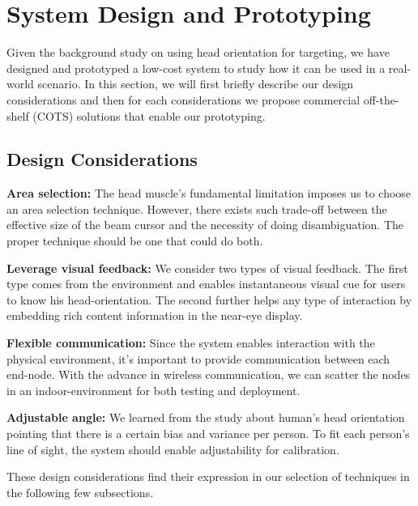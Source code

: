 \section{System Design and Prototyping}
\label{sec:syst-design-prot}
Given the background study on using head orientation for targeting, we have designed and prototyped a low-cost system to study how it can be used in a real-world scenario. In this section, we will first briefly describe our design considerations and then for each considerations we propose commercial off-the-shelf (COTS) solutions that enable our prototyping.

\subsection{Design Considerations}
\label{sec:design-cons}


{\bf Area selection:} The head muscle's fundamental limitation imposes us to choose an area selection technique. However, there exists such trade-off between the effective size of the beam cursor and the necessity of doing disambiguation. The proper technique should be one that could do both.

{\bf Leverage visual feedback:} We consider two types of visual feedback. The first type comes from the environment and enables instantaneous visual cue for users to know his head-orientation. The second further helps any type of interaction by embedding rich content information in the near-eye display.

{\bf Flexible communication:} Since the system enables interaction with the physical environment, it's important to provide communication between each end-node. With the advance in wireless communication, we can scatter the nodes in an indoor-environment for both testing and deployment.

{\bf Adjustable angle:} We learned from the study about human's head orientation pointing that there is a certain bias and variance per person. To fit each person's line of sight, the system should enable adjustability for calibration.

These design considerations find their expression in our selection of techniques in the following few subsections.

